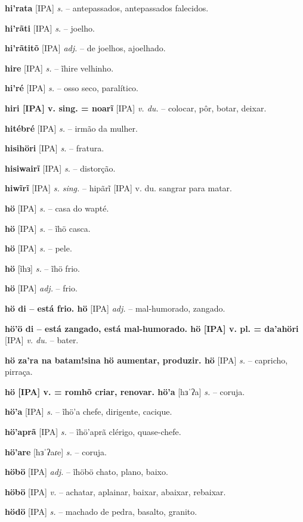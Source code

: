 \textbf{hi'rata} [IPA] \textit{s.} -- antepassados, antepassados falecidos.

\textbf{hi'rãti} [IPA] \textit{s.} -- joelho.

\textbf{hi'rãtitõ} [IPA] \textit{adj.} -- de joelhos, ajoelhado.

\textbf{hire} [IPA] \textit{s.} -- ĩhire velhinho.

\textbf{hi'ré} [IPA] \textit{s.} -- osso seco, paralítico.

\textbf{hiri [IPA] v. sing. = noarĩ} [IPA] \textit{v. du.} -- colocar, pôr, botar, deixar.

\textbf{hitébré} [IPA] \textit{s.} -- irmão da mulher.

\textbf{hisihöri} [IPA] \textit{s.} -- fratura.

\textbf{hisiwairĩ} [IPA] \textit{s.} -- distorção.

\textbf{hiwĩrĩ} [IPA] \textit{s. sing.} -- hipãrĩ [IPA] v. du. sangrar para matar.

\textbf{hö} [IPA] \textit{s.} -- casa do wapté.

\textbf{hö} [IPA] \textit{s.} -- ĩhö casca.

\textbf{hö} [IPA] \textit{s.} -- pele.

\textbf{hö} [ĩhɜ] \textit{s.} -- ĩhö frio.

\textbf{hö} [IPA] \textit{adj.} -- frio.

\textbf{hö di -- está frio. hö} [IPA] \textit{adj.} -- mal-humorado, zangado.

\textbf{hö'ö di -- está zangado, está mal-humorado. hö [IPA] v. pl. = da'ahöri} [IPA] \textit{v. du.} -- bater.

\textbf{hö za'ra na batam!sina hö aumentar, produzir. hö} [IPA] \textit{s.} -- capricho, pirraça.

\textbf{hö [IPA] v. = romhõ criar, renovar. hö'a} [hɜˈʔa] \textit{s.} -- coruja.

\textbf{hö'a} [IPA] \textit{s.} -- ĩhö'a chefe, dirigente, cacique.

\textbf{hö'aprã} [IPA] \textit{s.} -- ĩhö'aprã clérigo, quase-chefe.

\textbf{hö'are} [hɜˈʔaɾe] \textit{s.} -- coruja.

\textbf{höbö} [IPA] \textit{adj.} -- ĩhöbö chato, plano, baixo.

\textbf{höbö} [IPA] \textit{v.} -- achatar, aplainar, baixar, abaixar, rebaixar.

\textbf{hödö} [IPA] \textit{s.} -- machado de pedra, basalto, granito.

